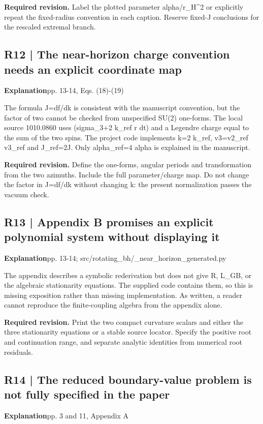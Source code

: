 \documentclass[10pt,a4paper]{article}
\begin{document}
\textbf{Required revision.} Label the plotted parameter alpha/r\_H\textasciicircum{}2 or explicitly repeat the fixed-radius convention in each caption. Reserve fixed-J conclusions for the rescaled extremal branch.

\subsection*{R12 | The near-horizon charge convention needs an explicit coordinate map}
\textbf{Explanation}\quad pp. 13-14, Eqs. (18)-(19)

The formula J=df/dk is consistent with the manuscript convention, but the factor of two cannot be checked from unspecified SU(2) one-forms. The local source 1010.0860 uses (sigma\_3+2 k\_ref r dt) and a Legendre charge equal to the sum of the two spins. The project code implements k=2 k\_ref, v3=v2\_ref v3\_ref and J\_ref=2J. Only alpha\_ref=4 alpha is explained in the manuscript.

\textbf{Required revision.} Define the one-forms, angular periods and transformation from the two azimuths. Include the full parameter/charge map. Do not change the factor in J=df/dk without changing k: the present normalization passes the vacuum check.

\subsection*{R13 | Appendix B promises an explicit polynomial system without displaying it}
\textbf{Explanation}\quad pp. 13-14; src/rotating\_bh/\_near\_horizon\_generated.py

The appendix describes a symbolic rederivation but does not give R, L\_GB, or the algebraic stationarity equations. The supplied code contains them, so this is missing exposition rather than missing implementation. As written, a reader cannot reproduce the finite-coupling algebra from the appendix alone.

\textbf{Required revision.} Print the two compact curvature scalars and either the three stationarity equations or a stable source locator. Specify the positive root and continuation range, and separate analytic identities from numerical root residuals.

\subsection*{R14 | The reduced boundary-value problem is not fully specified in the paper}
\textbf{Explanation}\quad pp. 3 and 11, Appendix A
\end{document}
